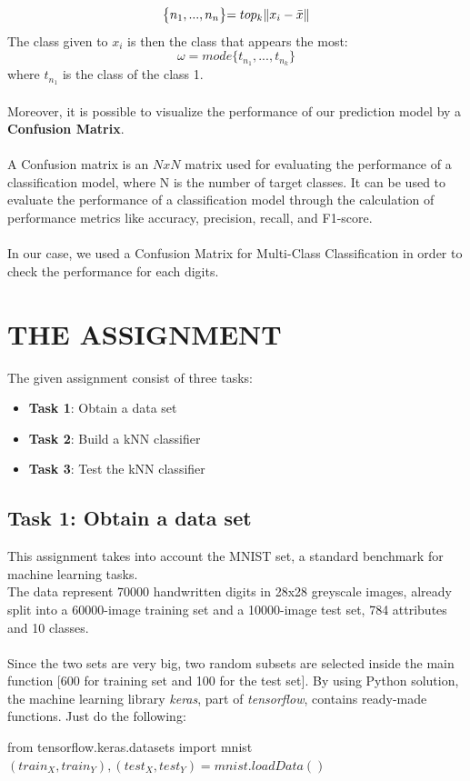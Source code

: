 \documentclass[10pt]{article}
\begin{document}
\begin{equation}
     \bigl\{ n_1,...,n_n\bigl\} = top_k\lVert x_i - \Bar{x} \rVert
\end{equation}
The class given to $x_i$ is then the class that appears the most:
\begin{equation}
     \omega = \textit{mode}\bigl\{ t_n_1,...,t_n_k\bigl\}
\end{equation}
where $t_n_1$ is the class of the class 1.
\\\\
Moreover, it is possible to visualize the performance of our prediction model by a \textbf{Confusion Matrix}.
\\\\
A Confusion matrix is an $N x N$ matrix used for evaluating the performance of a classification model, where N is the number of target classes.
It can be used to evaluate the performance of a classification model through the calculation of performance metrics like accuracy, precision, recall, and F1-score. 
\\\\
In our case, we used a Confusion Matrix for Multi-Class Classification in order to check the performance for each digits.
\newpage
\section{THE ASSIGNMENT}
The given assignment consist of three tasks:
\begin{itemize}
 \item \textbf{Task 1}: Obtain a data set
 \item \textbf{Task 2}: Build a kNN classifier
 \item \textbf{Task 3}: Test the kNN classifier
 \end{itemize} 

\subsection{Task 1: Obtain a data set}
This assignment takes into account the MNIST set, a standard benchmark for machine learning tasks. \\The data represent 70000 handwritten digits in 28x28 greyscale images, already split into a 60000-image training set and a 10000-image test set, 784 attributes and 10 classes.\\\\
Since the two sets are very big, two random subsets are selected inside the main function [600 for training set and 100 for the test set].
By using Python solution, the machine learning library \textit{keras}, part of \textit{tensorflow}, contains ready-made functions. Just do the following:
\begin{center}
    from tensorflow.keras.datasets import mnist
    $\left( train_X, train_Y\right), \left( test_X, test_Y\right) = mnist.loadData()$
\end{center}
\end{document}
